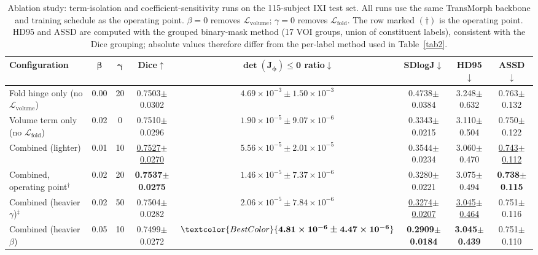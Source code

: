 \documentclass[jimaging,article,submit,pdftex,moreauthors]{Definitions/mdpi}
\newcommand{\best}[1]{\textcolor{BestColor}{\textbf{#1}}}
\newcommand{\snd}[1]{\textcolor{SndColor}{\underline{#1}}}
\newcommand{\bestm}[1]{\textcolor{BestColor}{\boldsymbol{#1}}}
\begin{document}
\begin{table}[H]
\caption{Ablation study: term-isolation and coefficient-sensitivity runs on the 115-subject IXI test set. All runs use the same TransMorph backbone and training schedule as the operating point. \(\beta=0\) removes \(\mathcal{L}_{\mathrm{volume}}\); \(\gamma=0\) removes \(\mathcal{L}_{\mathrm{fold}}\). The row marked \((\dagger)\) is the operating point. HD95 and ASSD are computed with the grouped binary-mask method (17 VOI groups, union of constituent labels), consistent with the Dice grouping; absolute values therefore differ from the per-label method used in Table~\ref{tab2}.\label{tab:ablation}}
\centering
\scriptsize
\setlength{\tabcolsep}{2.5pt}
\begin{tabularx}{\textwidth}{Xccccccc}
\toprule
\textbf{Configuration} & \(\boldsymbol{\beta}\) & \(\boldsymbol{\gamma}\) & \textbf{Dice\(\uparrow\)} & \(\boldsymbol{\det(J_\phi)\le 0}\) \textbf{ratio\(\downarrow\)} & \textbf{SDlogJ\(\downarrow\)} & \textbf{HD95\(\downarrow\)} & \textbf{ASSD\(\downarrow\)}\\
\midrule
Fold hinge only (no \(\mathcal{L}_{\mathrm{volume}}\)) & 0.00 & 20 & 0.7503\(\pm\)0.0302 & \(4.69\times10^{-3}\pm1.50\times10^{-3}\) & 0.4738\(\pm\)0.0384 & 3.248\(\pm\)0.632 & 0.763\(\pm\)0.132\\
Volume term only (no \(\mathcal{L}_{\mathrm{fold}}\)) & 0.02 & 0 & 0.7510\(\pm\)0.0296 & \(1.90\times10^{-5}\pm9.07\times10^{-6}\) & 0.3343\(\pm\)0.0215 & 3.110\(\pm\)0.504 & 0.750\(\pm\)0.122\\
Combined (lighter) & 0.01 & 10 & \snd{0.7527\(\pm\)0.0270} & \(5.56\times10^{-5}\pm2.01\times10^{-5}\) & 0.3544\(\pm\)0.0234 & 3.060\(\pm\)0.470 & \snd{0.743\(\pm\)0.112}\\
Combined, operating point\(^\dagger\) & 0.02 & 20 & \best{0.7537\(\pm\)0.0275} & \snd{\(1.46\times10^{-5}\pm7.37\times10^{-6}\)} & 0.3280\(\pm\)0.0221 & 3.075\(\pm\)0.494 & \best{0.738\(\pm\)0.115}\\
Combined (heavier \(\gamma\))\(^\ddagger\) & 0.02 & 50 & 0.7504\(\pm\)0.0282 & \(2.06\times10^{-5}\pm7.84\times10^{-6}\) & \snd{0.3274\(\pm\)0.0207} & \snd{3.045\(\pm\)0.464} & 0.751\(\pm\)0.116\\
Combined (heavier \(\beta\)) & 0.05 & 10 & 0.7499\(\pm\)0.0272 & \(\bestm{4.81\times10^{-6}\pm4.47\times10^{-6}}\) & \best{0.2909\(\pm\)0.0184} & \best{3.045\(\pm\)0.439} & 0.751\(\pm\)0.110\\
\bottomrule
\end{tabularx}

\end{table}
\end{document}
